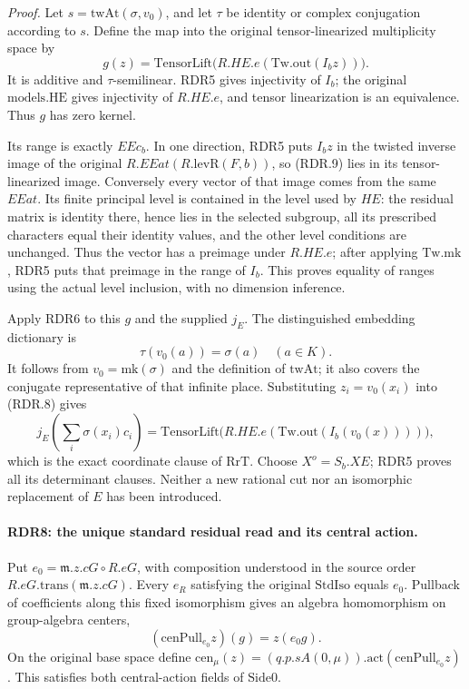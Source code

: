\emph{Proof.}
Let \(s=\mathrm{twAt}(\sigma,v_0)\), and let \(\tau\)
be identity or complex conjugation according to \(s\).
Define the map into the original tensor-linearized multiplicity space by
\[
 g(z)=\mathrm{TensorLift}\bigl(R.HE.e
                (\mathrm{Tw.out}(I_bz))\bigr).               \tag{RDR.9}
\]
It is additive and \(\tau\)-semilinear.  RDR5 gives
injectivity of \(I_b\); the original \(\mathrm{models.HE}\)
gives injectivity of \(R.HE.e\), and tensor linearization
is an equivalence.  Thus \(g\) has zero kernel.

Its range is exactly \(EEc_b\).  In one direction, RDR5
puts \(I_bz\) in the twisted inverse image of the original
\(R.EEat(R.\mathrm{levR}(F,b))\), so (RDR.9) lies in its
tensor-linearized image.  Conversely every vector of that
image comes from the same \(EEat\).  Its finite principal
level is contained in the level used by \(HE\): the residual
matrix is identity there, hence lies in the selected subgroup,
all its prescribed characters equal their identity values,
and the other level conditions are unchanged.  Thus the
vector has a preimage under \(R.HE.e\); after applying
\(\mathrm{Tw.mk}\), RDR5 puts that preimage in the range
of \(I_b\).  This proves equality of ranges using the
actual level inclusion, with no dimension inference.

Apply RDR6 to this \(g\) and the supplied \(j_E\).
The distinguished embedding dictionary is
\[
                    \tau(v_0(a))=\sigma(a)\quad(a\in K).
                                                               \tag{RDR.10}
\]
It follows from \(v_0=\mathrm{mk}(\sigma)\) and the definition
of \(\mathrm{twAt}\); it also covers the conjugate representative
of that infinite place.  Substituting \(z_i=v_0(x_i)\) into
(RDR.8) gives
\[
 j_E\left(\sum_i\sigma(x_i)c_i\right)
   =\mathrm{TensorLift}\bigl(R.HE.e
         (\mathrm{Tw.out}(I_b(v_0(x))))\bigr),               \tag{RDR.11}
\]
which is the exact coordinate clause of \(\mathrm{RrT}\).
Choose \(X^o=S_b.XE\); RDR5 proves all its determinant
clauses.  Neither a new rational cut nor an isomorphic
replacement of \(E\) has been introduced.

\paragraph{RDR8: the unique standard residual read and its central action.}
\label{claim:RDR8}
Put \(e_0=\mathfrak m.z.cG\circ R.eG\), with composition
understood in the source order \(R.eG.\mathrm{trans}(\mathfrak m.z.cG)\).
Every \(e_R\) satisfying the original \(\mathrm{StdIso}\)
equals \(e_0\).  Pullback of coefficients along this fixed
isomorphism gives an algebra homomorphism on group-algebra centers,
\[
       (\mathrm{cenPull}_{e_0}z)(g)=z(e_0g).                 \tag{RDR.12}
\]
On the original base space define
\(\mathrm{cen}_\mu(z)=
 (q.p.sA(0,\mu)).\mathrm{act}(\mathrm{cenPull}_{e_0}z)\).
This satisfies both central-action fields of \(\mathrm{Side0}\).

